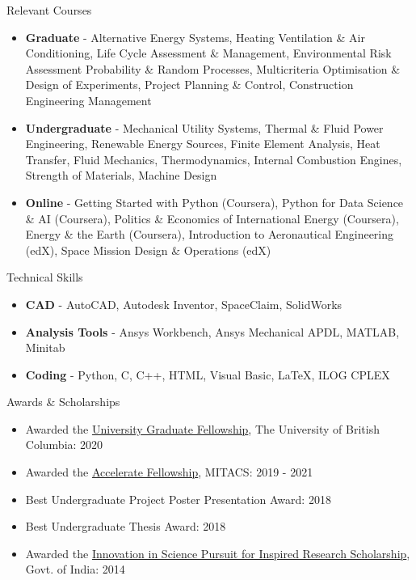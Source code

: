 \documentclass{resume} %
\begin{document}
\begin{rSection}{Relevant Courses}
\begin{itemize}[leftmargin=*]
\itemsep -0.5em 
\item \textbf{Graduate} - Alternative Energy Systems, Heating Ventilation \& Air Conditioning, Life Cycle Assessment \& Management, Environmental Risk Assessment Probability \& Random Processes, Multicriteria Optimisation \& Design of Experiments, Project Planning \& Control, Construction Engineering Management
\item \textbf{Undergraduate} - Mechanical Utility Systems, Thermal \& Fluid Power Engineering, Renewable Energy Sources, Finite Element Analysis, Heat Transfer, Fluid Mechanics, Thermodynamics, Internal Combustion Engines, Strength of Materials, Machine Design
\item \textbf{Online} - Getting Started with Python (Coursera), Python for Data Science \& AI (Coursera), Politics \& Economics of International Energy (Coursera), Energy \& the Earth (Coursera), Introduction to Aeronautical Engineering (edX), Space Mission Design \& Operations (edX)
\end{itemize}
\end{rSection}
\vspace*{-1mm}
\begin{rSection}{Technical Skills}
\begin{itemize}[leftmargin=*]
\itemsep -0.5em 
\item \textbf{CAD} - AutoCAD, Autodesk Inventor, SpaceClaim, SolidWorks
\item \textbf{Analysis Tools} - Ansys Workbench, Ansys Mechanical APDL, MATLAB, Minitab
\item \textbf{Coding } - Python, C, C++, HTML, Visual Basic, \LaTeX, ILOG CPLEX
\end{itemize}
\end{rSection}

\vspace*{-1mm}
\begin{rSection}{Awards \& Scholarships}
\begin{itemize}[leftmargin=*]
\itemsep -0.5em 
\item Awarded the \href{https://gradstudies.ok.ubc.ca/resources/award-opportunities/university-graduate-fellowship/}{University Graduate Fellowship}, The University of British Columbia: 2020
\item Awarded the \href{https://www.mitacs.ca/en/programs/accelerate/fellowship}{Accelerate Fellowship}, MITACS: 2019 - 2021
\item Best Undergraduate Project Poster Presentation Award: 2018
\item Best Undergraduate Thesis Award: 2018
\item Awarded the \href{http://www.inspire-dst.gov.in/scholarship.html}{Innovation   in   Science   Pursuit   for   Inspired   Research Scholarship}, Govt. of India: 2014
\end{itemize}
\end{rSection}
\end{document}
